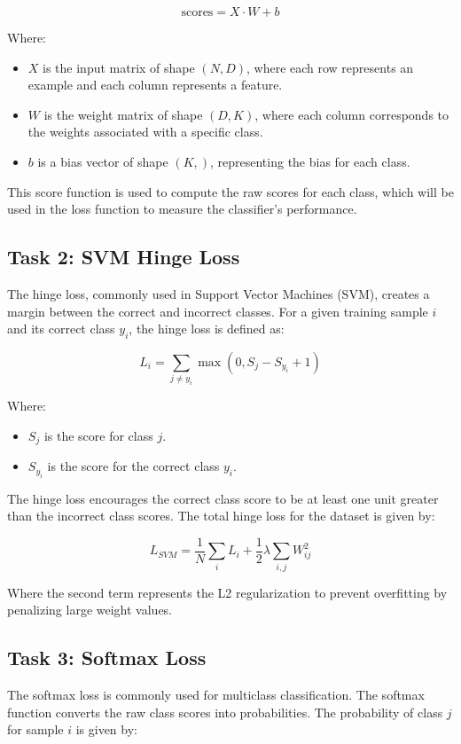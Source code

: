 \documentclass{article}
\begin{document}
\begin{equation}
\text{scores} = X \cdot W + b
\end{equation}

Where:
\begin{itemize}
    \item $X$ is the input matrix of shape $(N, D)$, where each row represents an example and each column represents a feature.
    \item $W$ is the weight matrix of shape $(D, K)$, where each column corresponds to the weights associated with a specific class.
    \item $b$ is a bias vector of shape $(K,)$, representing the bias for each class.
\end{itemize}

This score function is used to compute the raw scores for each class, which will be used in the loss function to measure the classifier's performance.

\subsection{Task 2: SVM Hinge Loss}
The hinge loss, commonly used in Support Vector Machines (SVM), creates a margin between the correct and incorrect classes. For a given training sample $i$ and its correct class $y_i$, the hinge loss is defined as:

\begin{equation}
L_i = \sum_{j \neq y_i} \max(0, S_j - S_{y_i} + 1)
\end{equation}

Where:
\begin{itemize}
    \item $S_j$ is the score for class $j$.
    \item $S_{y_i}$ is the score for the correct class $y_i$.
\end{itemize}

The hinge loss encourages the correct class score to be at least one unit greater than the incorrect class scores. The total hinge loss for the dataset is given by:

\begin{equation}
L_{SVM} = \frac{1}{N} \sum_{i} L_i + \frac{1}{2} \lambda \sum_{i,j} W_{ij}^2
\end{equation}

Where the second term represents the L2 regularization to prevent overfitting by penalizing large weight values.

\subsection{Task 3: Softmax Loss}
The softmax loss is commonly used for multiclass classification. The softmax function converts the raw class scores into probabilities. The probability of class $j$ for sample $i$ is given by:
\end{document}
